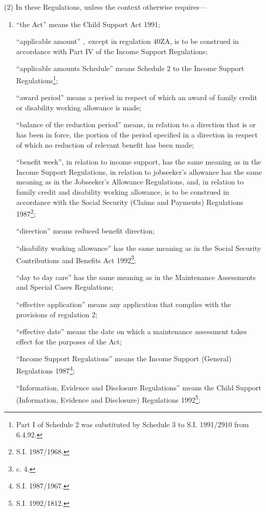 \documentclass[a4paper,12pt]{article}
\begin{document}
(2) In these Regulations, unless the context otherwise requires—
\begin{enumerate}\item[]
“the Act” means the Child Support Act 1991;

“applicable amount”%
,~except in regulation 40ZA,  %
 is to be construed in accordance with Part IV of the Income Support Regulations;

“applicable amounts Schedule” means Schedule 2 to the Income Support Regulations\footnote{\frenchspacing Part I of Schedule 2 was substituted by Schedule 3 to S.I. 1991/2910 from 6.4.92.};

“award period” means a period in respect of which an award of family credit or disability working allowance is made;

“balance of the reduction period” means, in relation to a direction that is or has been in force, the portion of the period specified in a direction in respect of which no reduction of relevant benefit has been made;

“benefit week”, in relation to income support, has the same meaning as in the Income Support Regulations, 
in relation to jobseeker’s allowance has the same meaning as in the Jobseeker’s Allowance Regulations,  %
and, in relation to family credit and disability working allowance, is to be construed in accordance with the Social Security (Claims and Payments) Regulations 1987\footnote{\frenchspacing S.I. 1987/1968.};

“direction” means reduced benefit direction;

“disability working allowance” has the same meaning as in the Social Security Contributions and Benefits Act 1992\footnote{ c. 4.};

“day to day care” has the same meaning as in the Maintenance Assessments and Special Cases Regulations;

“effective application” means any application that complies with the provisions of regulation 2;

“effective date” means the date on which a maintenance assessment takes effect for the purposes of the Act;

“Income Support Regulations” means the Income Support (General) Regulations 1987\footnote{\frenchspacing S.I. 1987/1967.};

“Information, Evidence and Disclosure Regulations” means the Child Support (Information, Evidence and Disclosure) Regulations 1992\footnote{\frenchspacing S.I. 1992/1812.};


\end{enumerate}
\end{document}
